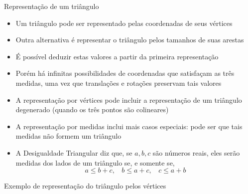 \begin{frame}[fragile]{Representação de um triângulo}

    \begin{itemize}
        \item Um triângulo pode ser representado pelas coordenadas de seus vértices

        \item Outra alternativa é representar o triângulo pelos tamanhos de suas arestas

        \item É possível deduzir estas valores a partir da primeira representação

        \item Porém há infinitas possibilidades de coordenadas que satisfaçam as três medidas,
            uma vez que translações e rotações preservam tais valores

        \item A representação por vértices pode incluir a representação de um triângulo degenerado
            (quando os três pontos são colineares)

        \item A representação por medidas inclui mais casos especiais: pode ser que tais
            medidas não formem um triângulo

        \item A Desigualdade Triangular diz que, se $a, b, c$ são números reais, eles serão
            medidas dos lados de um triângulo se, e somente se,
        \[
            a \leq b + c,\ \ \ \ b \leq a + c,\ \ \ \ c\leq a + b
        \]
    \end{itemize}

\end{frame}

\begin{frame}[fragile]{Exemplo de representação do triângulo pelos vértices}
\end{frame}
